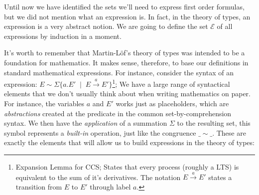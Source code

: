 Until now we have identified the sets we'll need to express first order formulas, but we
did not mention what an expression is. In fact, in the theory of types, an expression is a
very abstract notion. We are going to define the set $\mathcal{E}$ of all expressions by induction
in a moment. 

It's worth to remember that Martin-L\"{o}f's theory of types was intended to be a foundation
for mathematics. It makes sense, therefore, to base our definitions in standard mathematical expressions.
For instance, consider the syntax of an expression: $E \sim \Sigma \{ a.E' \;\mid\; E \xrightarrow{\;a\;} E' \}$\footnote{%
Expansion Lemma for CCS; States that every process (roughly a LTS) is equivalent to the sum of it's derivatives.
The notation $E \xrightarrow{\;a\;} E'$ states a transition from $E$ to $E'$ through label $a$.
}; We have a large range of syntactical elements that we don't usually think about when writing
mathematics on paper. For instance, the variables $a$ and $E'$ works just as placeholders, which
are \emph{abstractions} created at the predicate in the common set-by-comprehension syntax. We then
have the \emph{application} of a summation $\Sigma$ to the resulting set, this symbol represents
a \emph{built-in} operation, just like the congruence $\_\sim\_$. These are exactly the elements
that will allow us to build expressions in the theory of types:\\

